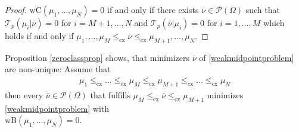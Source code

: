 \documentclass[10pt,a4paper]{amsart}
\begin{document}
\begin{proof}
	$\text{wC}(\mu_1,\dots,\mu_N)=0$ if and only if there exists $\bar\nu\in\mathcal P(\Omega)$ such that $\mathcal T_p(\mu_i|\bar\nu)=0$ for $i=M+1,\dots,N$ and $\mathcal T_p(\bar\nu|\mu_i)=0$ for $i=1,\dots,M$ which holds if and only if $\mu_1,\dots,\mu_M\leq_{\text{cx}}\bar\nu\leq_{\text{cx}}\mu_{M+1},\dots,\mu_{N}$.
\end{proof}
Proposition \ref{zeroclassprop} shows, that minimizers $\bar\nu$ of \eqref{weakmidpointproblem} are non-unique: Assume that
\begin{gather*}
	\mu_1\leq_{\text{cx}}\dots\leq_{\text{cx}}\mu_M\leq_{\text{cx}}\mu_{M+1}\leq_{\text{cx}}\dots\leq_{\text{cx}}\mu_{N}
\end{gather*}then every $\bar\nu\in\mathcal P(\Omega)$ that fulfills $\mu_M\leq_{\text{cx}}\bar\nu\leq_{\text{cx}}\mu_{M+1}$ minimizes \eqref{weakmidpointproblem} with\\ $\text{wB}(\mu_1,\dots,\mu_N)=0$.
\end{document}
